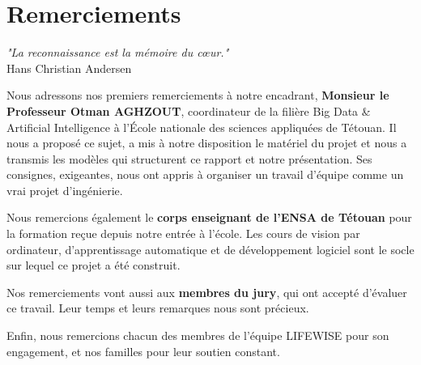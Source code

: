 \chapter*{\textcolor{mycolor}{Remerciements}}

\begin{center}
\textit{"La reconnaissance est la mémoire du cœur."}\\
Hans Christian Andersen
\end{center}

\vspace{0.5cm}

Nous adressons nos premiers remerciements à notre encadrant, \textbf{Monsieur le Professeur Otman AGHZOUT},
coordinateur de la filière Big Data \& Artificial Intelligence à l'École nationale des sciences appliquées de
Tétouan. Il nous a proposé ce sujet, a mis à notre disposition le matériel du projet et nous a transmis les modèles
qui structurent ce rapport et notre présentation. Ses consignes, exigeantes, nous ont appris à organiser un travail
d'équipe comme un vrai projet d'ingénierie.

Nous remercions également le \textbf{corps enseignant de l'ENSA de Tétouan} pour la formation reçue depuis notre
entrée à l'école. Les cours de vision par ordinateur, d'apprentissage automatique et de développement logiciel sont
le socle sur lequel ce projet a été construit.

Nos remerciements vont aussi aux \textbf{membres du jury}, qui ont accepté d'évaluer ce travail. Leur temps et
leurs remarques nous sont précieux.

Enfin, nous remercions chacun des membres de l'équipe LIFEWISE pour son engagement, et nos familles pour leur
soutien constant.

